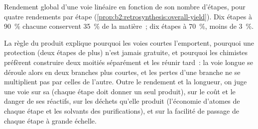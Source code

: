\begin{omfigure}
\par\vspace{4pt}

{\small Rendement global d'une voie linéaire en fonction de son nombre d'étapes, pour quatre rendements
par étape (\cref{prop:b2:retrosynthesis:overall-yield}). Dix étapes à 90~\% chacune conservent 35~\% de
la matière~; dix étapes à 70~\%, moins de 3~\%.}
\end{omfigure}

La règle du produit explique pourquoi les voies courtes l'emportent, pourquoi une protection (deux étapes
de plus) n'est jamais gratuite, et pourquoi les chimistes préfèrent construire deux moitiés séparément et
les réunir tard~: la voie longue se déroule alors en deux branches plus courtes, et les pertes d'une
branche ne se multiplient pas par celles de l'autre. Outre le rendement et la longueur, on juge une voie
sur sa  (chaque étape doit donner un seul produit), sur le coût et le danger de ses réactifs,
sur les déchets qu'elle produit (l'économie d'atomes de chaque étape et les solvants des purifications),
et sur la facilité de passage de chaque étape à grande échelle.

